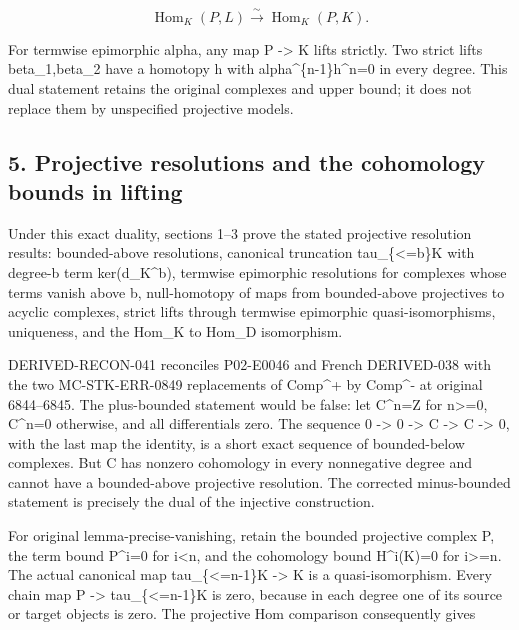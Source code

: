 \documentclass[11pt]{article}
\begin{document}
\[
 \operatorname{Hom}_K(P,L)\xrightarrow{\sim}\operatorname{Hom}_K(P,K).
                                                               \tag{4.5}
\]

For termwise epimorphic alpha,\allowbreak{} any map P \allowbreak{}-> K lifts strictly. Two strict lifts beta\_\allowbreak{}1,\allowbreak{}beta\_\allowbreak{}2 have a homotopy h with alpha\textasciicircum{}\{n-1\}h\textasciicircum{}n\allowbreak{}=0 in every degree. This dual statement retains the original complexes and upper bound; it does not replace them by unspecified projective models.

\subsection{5. Projective resolutions and the cohomology bounds in lifting}\label{proofs-6209-7089-projective-resolutions-and-the-cohomology-bounds-in-lifting}

Under this exact duality,\allowbreak{} sections 1–\allowbreak{}3 prove the stated projective resolution results:\allowbreak{} bounded-above resolutions,\allowbreak{} canonical truncation tau\_\allowbreak{}\{<\allowbreak{}=b\}K with degree-b term ker(d\_\allowbreak{}K\textasciicircum{}b)\allowbreak{},\allowbreak{} termwise epimorphic resolutions for complexes whose terms vanish above b,\allowbreak{} null-homotopy of maps from bounded-above projectives to acyclic complexes,\allowbreak{} strict lifts through termwise epimorphic quasi-isomorphisms,\allowbreak{} uniqueness,\allowbreak{} and the Hom\_\allowbreak{}K to Hom\_\allowbreak{}D isomorphism.

DERIVED-RECON-041 reconciles P02-E0046 and French DERIVED-038 with the two MC-STK-ERR-0849 replacements of Comp\textasciicircum{}\allowbreak{}+ by Comp\^{}- at original 6844–\allowbreak{}6845. The plus-bounded statement would be false:\allowbreak{} let C\textasciicircum{}n\allowbreak{}=Z for n>\allowbreak{}=0,\allowbreak{} C\textasciicircum{}n\allowbreak{}=0 otherwise,\allowbreak{} and all differentials zero. The sequence 0 \allowbreak{}-> 0 \allowbreak{}-> C \allowbreak{}-> C \allowbreak{}-> 0,\allowbreak{} with the last map the identity,\allowbreak{} is a short exact sequence of bounded-below complexes. But C has nonzero cohomology in every nonnegative degree and cannot have a bounded-above projective resolution. The corrected minus-bounded statement is precisely the dual of the injective construction.

For original lemma-precise-vanishing,\allowbreak{} retain the bounded projective complex P,\allowbreak{} the term bound P\textasciicircum{}i\allowbreak{}=0 for i<n,\allowbreak{} and the cohomology bound H\textasciicircum{}i(K)\allowbreak{}\allowbreak{}=0 for i>\allowbreak{}=n. The actual canonical map tau\_\allowbreak{}\{<\allowbreak{}=n-1\}K \allowbreak{}-> K is a quasi-isomorphism. Every chain map P \allowbreak{}-> tau\_\allowbreak{}\{<\allowbreak{}=n-1\}K is zero,\allowbreak{} because in each degree one of its source or target objects is zero. The projective Hom comparison consequently gives
\end{document}
